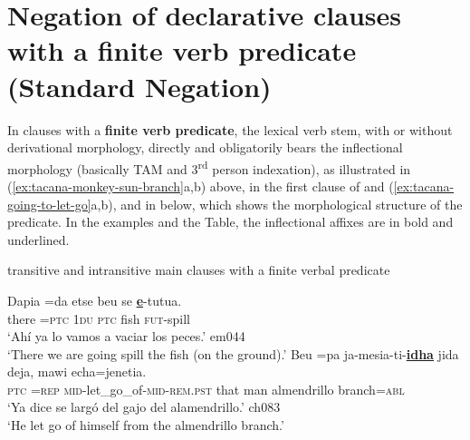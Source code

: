 \documentclass[output=paper]{langsci/langscibook}
\begin{document}
\section{Negation of declarative clauses with a finite verb predicate (Standard Negation)}\label{sec:tacana-3}

In clauses with a \textbf{finite verb predicate}, the lexical verb stem,
with or without derivational morphology, directly and obligatorily bears
the inflectional morphology (basically TAM and 3\textsuperscript{rd} person
indexation), as illustrated in (\ref{ex:tacana-monkey-sun-branch}a,b)
above, in the first clause of  and
(\ref{ex:tacana-going-to-let-go}a,b), and in  below, which shows the morphological structure of the predicate. In the examples and the Table, the inflectional affixes are in bold and underlined.
%
\begin{exe}\ex\label{ex:tacana-going-to-let-go}  transitive and intransitive main clauses with a finite verbal predicate
\begin{xlist}
\ex\label{ex:tacana-going-to-spill}
  \gll Dapia  =da  etse  beu
  se
  \textbf{\underline{e}}-tutua.\\
there  =\textsc{ptc}  1\textsc{du}  \textsc{ptc}  fish
\textsc{fut}-spill\\
\glt `Ahí ya lo vamos a vaciar los peces.' em044\\
`There we are going spill the fish (on the ground).'
\ex\label{ex:tacana-let-go}
  \gll Beu  =pa
  ja-mesia-ti-\textbf{\underline{idha}}
  jida  deja, mawi
  echa=jenetia.\\
    \textsc{ptc}  =\textsc{rep}
    \textsc{mid}-let\_go\_of-\textsc{mid-rem.pst}  that  man almendrillo
    branch=\textsc{abl}\\
\glt `Ya dice se largó del gajo del alamendrillo.' ch083\\
`He let go of himself from the almendrillo branch.'
\end{xlist}\end{exe}
\end{document}
